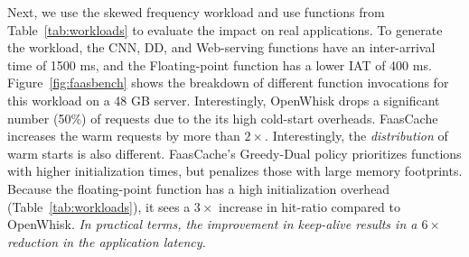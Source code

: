 

Next, we use the skewed frequency workload and use functions from Table~\ref{tab:workloads} to evaluate the impact on real applications. 
To generate the workload, the CNN, DD, and Web-serving functions have an inter-arrival time of 1500 ms, and the Floating-point function has a lower IAT of 400 ms. 
%
Figure~\ref{fig:faasbench} shows the breakdown of different function invocations for this workload on a 48 GB server.
Interestingly, OpenWhisk drops a significant number (50\%) of requests due to the its high cold-start overheads.
FaasCache increases the warm requests by more than $2\times$. 
Interestingly, the \emph{distribution} of warm starts is also different. 
FaasCache's Greedy-Dual policy prioritizes functions with higher initialization times, but penalizes those with large memory footprints.
Because the floating-point function has a high initialization overhead (Table~\ref{tab:workloads}), it sees a $3\times$ increase in hit-ratio compared to OpenWhisk.
\emph{In practical terms, the improvement in keep-alive results in a $6\times$ reduction in the application latency.
}



